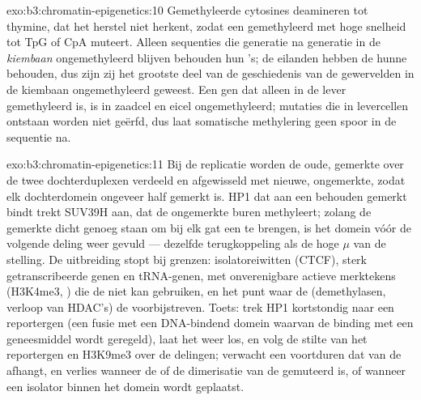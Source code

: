 \begin{solution}{exo:b3:chromatin-epigenetics:10}
Gemethyleerde cytosines deamineren tot thymine, dat het herstel niet
herkent, zodat een gemethyleerd  met hoge snelheid tot TpG of CpA
muteert. Alleen sequenties die generatie na generatie in de
\emph{kiembaan} ongemethyleerd blijven behouden hun 's; de eilanden
hebben de hunne behouden, dus zijn zij het grootste deel van de
geschiedenis van de gewervelden in de kiembaan ongemethyleerd geweest.
Een gen dat alleen in de lever gemethyleerd is, is in zaadcel en
eicel ongemethyleerd; mutaties die in levercellen ontstaan worden niet
geërfd, dus laat somatische methylering geen spoor in de sequentie na.
\end{solution}

\begin{solution}{exo:b3:chromatin-epigenetics:11}
Bij de replicatie worden de oude, gemerkte  over de twee
dochterduplexen verdeeld en afgewisseld met nieuwe, ongemerkte, zodat
elk dochterdomein ongeveer half gemerkt is. HP1 dat aan een behouden
gemerkt  bindt trekt SUV39H aan, dat de ongemerkte buren
methyleert; zolang de gemerkte  dicht genoeg staan om bij
elk gat een  te brengen, is het domein vóór de volgende
deling weer gevuld --- dezelfde terugkoppeling als de hoge $\mu$ van
de stelling. De uitbreiding stopt bij grenzen: isolatoreiwitten
(CTCF), sterk getranscribeerde genen en tRNA-genen,  met
onverenigbare actieve merktekens (H3K4me3, ) die de
 niet kan gebruiken, en het punt waar de 
(demethylasen, verloop van HDAC's) de  voorbijstreven. Toets:
trek HP1 kortstondig naar een reportergen (een fusie met een
DNA-bindend domein waarvan de binding met een geneesmiddel wordt
geregeld), laat het weer los, en volg de stilte van het reportergen en
H3K9me3 over de delingen; verwacht een voortduren dat van de 
afhangt, en verlies wanneer de  of de dimerisatie van de
 gemuteerd is, of wanneer een isolator binnen het domein wordt
geplaatst.
\end{solution}

